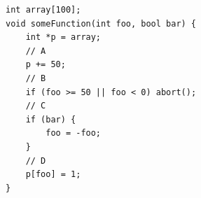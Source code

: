 \documentclass[tikz]{standalone}
\begin{document}
\begin{lrbox}{\boundsModelCode}
\begin{lstlisting}
int array[100];
void someFunction(int foo, bool bar) {
    int *p = array;
    // A
    p += 50;
    // B
    if (foo >= 50 || foo < 0) abort();
    // C
    if (bar) {
        foo = -foo;
    }
    // D
    p[foo] = 1;
}
\end{lstlisting}
\end{lrbox}



\end{document}
